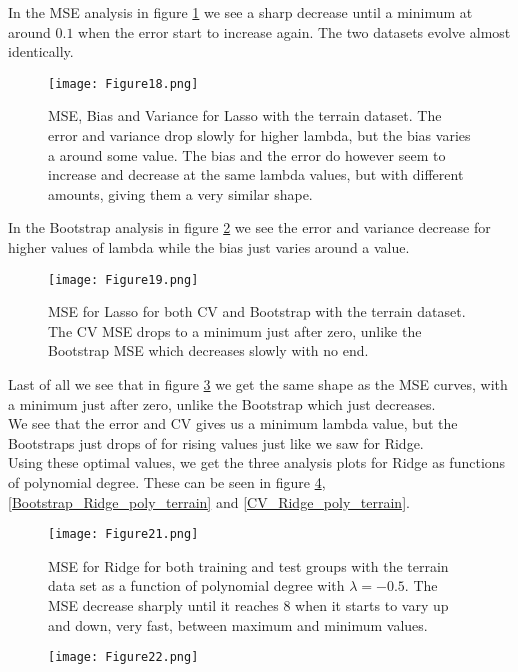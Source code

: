 \documentclass[11pt, A4paper, english]{article}
\begin{document}
\begin{multicols}{2}
\begin{figure}[H]
\label{MSE_Lasso_lambda_terrain}
			\end{figure}
In the MSE analysis in figure \ref{MSE_Lasso_lambda_terrain} we see a sharp decrease until a minimum at around $0.1$ when the error start to increase again. The two datasets evolve almost identically.
			\begin{figure}[H]
\texttt{[image: Figure18.png]}
\caption{MSE, Bias and Variance for Lasso with the terrain dataset. The error and variance drop slowly for higher lambda, but the bias varies a around some value. The bias and the error do however seem to increase and decrease at the same lambda values, but with different amounts, giving them a very similar shape.}
\label{Bootstrap_Lasso_lambda_terrain}
			\end{figure}
In the Bootstrap analysis in figure \ref{Bootstrap_Lasso_lambda_terrain} we see the error and variance decrease for higher values of lambda while the bias just varies around a value.
			\begin{figure}[H]
\texttt{[image: Figure19.png]}
\caption{MSE for Lasso for both CV and Bootstrap with the terrain dataset. The CV MSE drops to a minimum just after zero, unlike the Bootstrap MSE which decreases slowly with no end.}
\label{CV_Lasso_lambda_terrain}
			\end{figure}
Last of all we see that in figure \ref{CV_Lasso_lambda_terrain} we get the same shape as the MSE curves, with a minimum just after zero, unlike the Bootstrap which just decreases. \\
We see that the error and CV gives us a minimum lambda value, but the Bootstraps just drops of for rising values just like we saw for Ridge. \\
Using these optimal values, we get the three analysis plots for Ridge as functions of polynomial degree. These can be seen in figure \ref{MSE_Ridge_poly_terrain}, \ref{Bootstrap_Ridge_poly_terrain} and \ref{CV_Ridge_poly_terrain}.
			\begin{figure}[H]
\texttt{[image: Figure21.png]}
\caption{MSE for Ridge for both training and test groups with the terrain data set as a function of polynomial degree with $\lambda = -0.5$. The MSE decrease sharply until it reaches 8 when it starts to vary up and down, very fast, between maximum and minimum values.}
\label{MSE_Ridge_poly_terrain}
			\end{figure}
			\begin{figure}[H]
\texttt{[image: Figure22.png]}

\end{figure}
\end{multicols}
\end{document}
